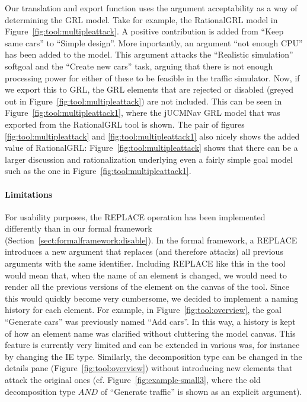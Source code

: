 Our translation and export function uses the argument acceptability as a way of determining the GRL model. Take for example, the RationalGRL model in Figure~\ref{fig:tool:multipleattack}. A positive contribution is added from ``Keep same cars'' to ``Simple design''. More inportantly, an argument ``not enough CPU'' has been added to the model. This argument attacks the ``Realistic simulation'' softgoal and the ``Create new cars'' task, arguing that there is not enough processing power for either of these to be feasible in the traffic simulator. Now, if we export this to GRL, the GRL elements that are rejected or disabled (greyed out in Figure~\ref{fig:tool:multipleattack}) are not included. This can be seen in Figure~\ref{fig:tool:multipleattack1}, where the jUCMNav GRL model that was exported from the RationalGRL tool is shown. The pair of figures \ref{fig:tool:multipleattack} and \ref{fig:tool:multipleattack1} also nicely shows the added value of RationalGRL: Figure~\ref{fig:tool:multipleattack} shows that there can be a larger discussion and rationalization underlying even a fairly simple goal model such as the one in Figure~\ref{fig:tool:multipleattack1}. 

\paragraph{Limitations}
For usability purposes, the \textsf{REPLACE} operation has been implemented differently than in our formal framework (Section~\ref{sect:formalframework:disable}). In the formal framework, a \textsf{REPLACE} introduces a new argument that replaces (and therefore attacks) all previous arguments with the same identifier. Including \textsf{REPLACE} like this in the tool would mean that, when the name of an element is changed, we would need to render all the previous versions of the element on the canvas of the tool. Since this would quickly become very cumbersome, we decided to implement a naming history for each element. For example, in Figure~\ref{fig:tool:overview}, the goal ``Generate cars'' was previously named ``Add cars''. In this way, a history is kept of how an element name was clarified without cluttering the model canvas. This feature is currently very limited and can be extended in various was, for instance by changing the IE type. Similarly, the decomposition type can be changed in the details pane (Figure~\ref{fig:tool:overview}) without introducing new elements that attack the original ones (cf. Figure~\ref{fig:example-small3}, where the old decomposition type $AND$ of ``Generate traffic'' is shown as an explicit argument).